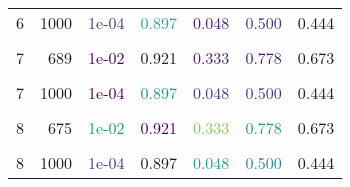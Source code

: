 \begin{table}
{\begin{tabular}[t]{rr>{}r>{}r>{}r>{}rr}
6 & 1000 & \textcolor[HTML]{443983}{1e-04} & \textcolor[HTML]{23A983}{0.897} & \textcolor[HTML]{481F70}{0.048} & \textcolor[HTML]{472F7D}{0.500} & 0.444\\
\cellcolor{gray!6}{7} & \cellcolor{gray!6}{166} & \textcolor[HTML]{443983}{\cellcolor{gray!6}{1e-01}} & \textcolor[HTML]{23A983}{\cellcolor{gray!6}{0.901}} & \textcolor[HTML]{481F70}{\cellcolor{gray!6}{0.286}} & \textcolor[HTML]{472F7D}{\cellcolor{gray!6}{0.545}} & \cellcolor{gray!6}{0.539}\\
7 & 689 & \textcolor[HTML]{440154}{1e-02} & \textcolor[HTML]{1E9C89}{0.921} & \textcolor[HTML]{481F70}{0.333} & \textcolor[HTML]{481F70}{0.778} & 0.673\\
\cellcolor{gray!6}{7} & \cellcolor{gray!6}{1000} & \textcolor[HTML]{440154}{\cellcolor{gray!6}{1e-03}} & \textcolor[HTML]{1F968B}{\cellcolor{gray!6}{0.901}} & \textcolor[HTML]{453882}{\cellcolor{gray!6}{0.095}} & \textcolor[HTML]{453781}{\cellcolor{gray!6}{0.667}} & \cellcolor{gray!6}{0.542}\\
7 & 1000 & \textcolor[HTML]{440154}{1e-04} & \textcolor[HTML]{1F968B}{0.897} & \textcolor[HTML]{453882}{0.048} & \textcolor[HTML]{453781}{0.500} & 0.444\\
\hline
\cellcolor{gray!6}{8} & \cellcolor{gray!6}{165} & \textcolor[HTML]{21908D}{\cellcolor{gray!6}{1e-01}} & \textcolor[HTML]{440154}{\cellcolor{gray!6}{0.916}} & \textcolor[HTML]{7AD151}{\cellcolor{gray!6}{0.333}} & \textcolor[HTML]{20928C}{\cellcolor{gray!6}{0.700}} & \cellcolor{gray!6}{0.633}\\
8 & 675 & \textcolor[HTML]{21908D}{1e-02} & \textcolor[HTML]{440154}{0.921} & \textcolor[HTML]{7AD151}{0.333} & \textcolor[HTML]{20928C}{0.778} & 0.673\\
\cellcolor{gray!6}{8} & \cellcolor{gray!6}{1000} & \textcolor[HTML]{31688E}{\cellcolor{gray!6}{1e-03}} & \textcolor[HTML]{2D718E}{\cellcolor{gray!6}{0.906}} & \textcolor[HTML]{2CB17E}{\cellcolor{gray!6}{0.143}} & \textcolor[HTML]{26AD81}{\cellcolor{gray!6}{0.750}} & \cellcolor{gray!6}{0.599}\\
8 & 1000 & \textcolor[HTML]{443983}{1e-04} & \textcolor[HTML]{355E8D}{0.897} & \textcolor[HTML]{1F9F88}{0.048} & \textcolor[HTML]{24868E}{0.500} & 0.444\\
\bottomrule
\end{tabular}}
\end{table}

